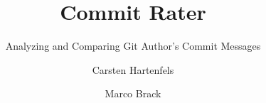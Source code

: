 \documentclass{llncs}
\begin{document}
\title{Commit Rater}
\subtitle{Analyzing and Comparing Git Author's Commit Messages}
\author{Carsten Hartenfels \and Marco Brack}

\maketitle









\appendix





\end{document}
